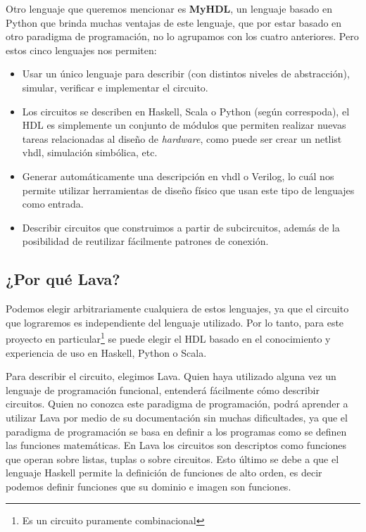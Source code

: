 Otro lenguaje que queremos mencionar es \textbf{MyHDL}\cite{MyHDL}, un lenguaje basado en Python que brinda muchas ventajas de este lenguaje, que por estar basado en otro paradigma de programación, no lo agrupamos con los cuatro anteriores. Pero estos cinco lenguajes nos permiten:

\begin{itemize}
\item Usar un único lenguaje para describir (con distintos niveles de abstracción), simular, verificar e implementar el circuito.
\item Los circuitos se describen en Haskell, Scala o Python (según correspoda), el HDL es simplemente un conjunto de módulos que permiten realizar nuevas tareas relacionadas al diseño de \emph{hardware}, como puede ser crear un netlist \gls{vhdl}, simulación simbólica, etc. 
\item Generar automáticamente una descripción en \gls{vhdl} o Verilog, lo cuál nos permite utilizar herramientas de diseño físico que usan este tipo de lenguajes como entrada.
\item Describir circuitos que construimos a partir de subcircuitos, además de la posibilidad de reutilizar fácilmente patrones de conexión.
\end{itemize}

\subsection{¿Por qué Lava?}
Podemos elegir arbitrariamente cualquiera de estos lenguajes, ya que el circuito que lograremos es independiente del lenguaje utilizado. Por lo tanto, para este proyecto en particular\footnote{Es un circuito puramente combinacional} se puede elegir el HDL basado en el conocimiento y experiencia de uso en Haskell, Python o Scala.

Para describir el circuito, elegimos Lava. Quien haya utilizado alguna vez un lenguaje de programación funcional, entenderá fácilmente cómo describir circuitos. Quien no conozca este paradigma de programación, podrá aprender a utilizar Lava por medio de su documentación\cite{Lava-tutorial} sin muchas dificultades, ya que el paradigma de programación se basa en definir a los programas como se definen las funciones matemáticas. En Lava los circuitos son descriptos como funciones que operan sobre listas, tuplas o sobre circuitos. Esto último se debe a que el lenguaje Haskell permite la definición de funciones de alto orden, es decir podemos definir funciones que su dominio e imagen son funciones. 

